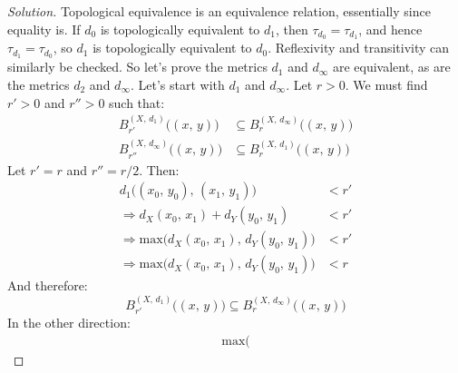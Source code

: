 \documentclass{article}
\theoremstyle{normal}
\begin{document}
    \begin{proof}[Solution]
        Topological equivalence is an equivalence relation, essentially since
        equality is. If $d_{0}$ is topologically equivalent to $d_{1}$, then
        $\tau_{d_{0}}=\tau_{d_{1}}$, and hence
        $\tau_{d_{1}}=\tau_{d_{0}}$, so $d_{1}$ is topologically equivalent to
        $d_{0}$. Reflexivity and transitivity can similarly be checked.
        So let's prove the metrics $d_{1}$ and $d_{\infty}$ are equivalent, as
        are the metrics $d_{2}$ and $d_{\infty}$. Let's start with
        $d_{1}$ and $d_{\infty}$. Let $r>0$. We must find
        $r'>0$ and $r''>0$ such that:
        \begin{subequations}
            \begin{align}
                B_{r'}^{(X,\,d_{1})}\big((x,\,y)\big)&\subseteq
                    B_{r}^{(X,\,d_{\infty})}\big((x,\,y)\big)\\
                B_{r''}^{(X,\,d_{\infty})}\big((x,\,y)\big)&\subseteq
                    B_{r}^{(X,\,d_{1})}\big((x,\,y)\big)
            \end{align}
        \end{subequations}
        Let $r'=r$ and $r''=r/2$. Then:
        \begin{subequations}
            \begin{align}
                d_{1}\big((x_{0},\,y_{0}),\,(x_{1},\,y_{1})\big)
                &<r'\\
                \Rightarrow
                d_{X}(x_{0},\,x_{1})+d_{Y}(y_{0},\,y_{1})&<r'\\
                \Rightarrow
                \textrm{max}\big(%
                    d_{X}(x_{0},\,x_{1}),\,d_{Y}(y_{0},\,y_{1})
                \big)&<r'\\
                \Rightarrow
                \textrm{max}\big(%
                    d_{X}(x_{0},\,x_{1}),\,d_{Y}(y_{0},\,y_{1})
                \big)&<r
            \end{align}
        \end{subequations}
        And therefore:
        \begin{equation}
            B_{r'}^{(X,\,d_{1})}\big((x,\,y)\big)\subseteq
                B_{r}^{(X,\,d_{\infty})}\big((x,\,y)\big)
        \end{equation}
        In the other direction:
        \begin{subequations}
            \begin{align}
                \textrm{max}\big(%

\end{align}
\end{subequations}
\end{proof}
\end{document}
